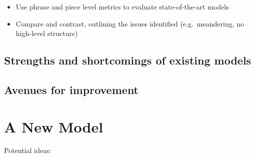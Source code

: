 \documentclass[12pt,a4paper,]{report}
\providecommand{\tightlist}{%
  \setlength{\itemsep}{0pt}\setlength{\parskip}{0pt}}
\begin{document}
\begin{itemize}
\tightlist
\item
  Use phrase and piece level metrics to evaluate state-of-the-art models
\item
  Compare and contrast, outlining the issues identified
  (e.g.~meandering, no high-level structure)
\end{itemize}

\hypertarget{strengths-and-shortcomings-of-existing-models}{%
\section{Strengths and shortcomings of existing
models}\label{strengths-and-shortcomings-of-existing-models}}

\hypertarget{avenues-for-improvement}{%
\section{Avenues for improvement}\label{avenues-for-improvement}}

\hypertarget{a-new-model}{%
\chapter{A New Model}\label{a-new-model}}

Potential ideas:
\end{document}
